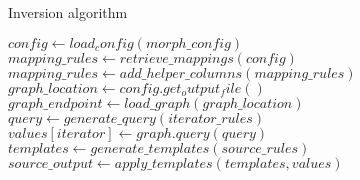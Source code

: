 \begin{algorithm}
    \caption{Inversion algorithm}
    \label{alg:inversion}
    \begin{algorithmic}[1]
        \State $config \gets load_config(morph\_config)$
        \State $mapping\_rules \gets retrieve\_mappings(config)$
        \State $mapping\_rules \gets add\_helper\_columns(mapping\_rules)$
        \State $graph\_location \gets config.get_output_file()$
        \State $graph\_endpoint \gets load\_graph(graph\_location)$
                \State $query \gets generate\_query(iterator\_rules)$
                \State $values[iterator] \gets graph.query(query)$
            \EndFor
            \State $templates \gets generate\_templates(source\_rules)$
            \State $source\_output \gets apply\_templates(templates, values)$
        \EndFor
    \end{algorithmic}
\end{algorithm}

